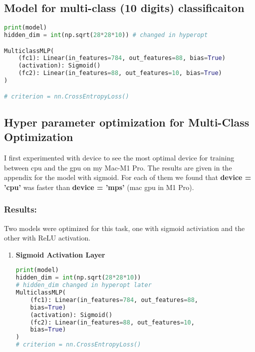 \begin{solve}

    \subsection{Model for multi-class (10 digits) classificaiton}

    \begin{lstlisting}[language=python]
print(model)
hidden_dim = int(np.sqrt(28*28*10)) # changed in hyperopt

MulticlassMLP(
    (fc1): Linear(in_features=784, out_features=88, bias=True)
    (activation): Sigmoid()
    (fc2): Linear(in_features=88, out_features=10, bias=True)
)

# criterion = nn.CrossEntropyLoss()

    \end{lstlisting}


    \subsection{Hyper parameter optimization for Multi-Class Optimization}
    
    I first experimented with device to see the most optimal device for training between cpu and the gpu on my Mac-M1 Pro. The results are given in the appendix for the model with sigmoid. For each of them we found that \textbf{device = 'cpu'} was faster than  \textbf{device = 'mps'} (mac gpu in M1 Pro).

    \subsubsection{Results:}
    Two models were optimized for this task, one with sigmoid activiation and the other with ReLU activation.

    \begin{enumerate}
        \item \textbf{Sigmoid Activation Layer}
        
        \begin{lstlisting}[language=python]
print(model)
hidden_dim = int(np.sqrt(28*28*10)) 
# hidden_dim changed in hyperopt later
MulticlassMLP(
    (fc1): Linear(in_features=784, out_features=88, 
    bias=True)
    (activation): Sigmoid()
    (fc2): Linear(in_features=88, out_features=10, 
    bias=True)
)
# criterion = nn.CrossEntropyLoss()
        \end{lstlisting}



\end{enumerate}
\end{solve}

